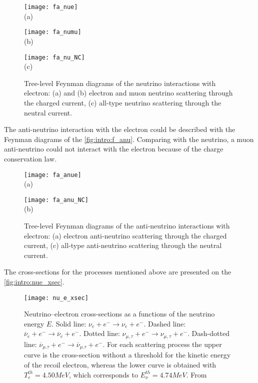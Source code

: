 \documentclass[../main.tex]{subfiles}
\begin{document}
\begin{figure}[!ht]
\centering
  \begin{minipage}[t]{0.29\linewidth}
    \centering
    \texttt{[image: fa\_nue]} \\ (a)
  \end{minipage}
  \begin{minipage}[t]{0.29\linewidth}
    \centering
    \texttt{[image: fa\_numu]} \\ (b)
  \end{minipage}
  \begin{minipage}[t]{0.29\linewidth}
    \centering
    \texttt{[image: fa\_nu\_NC]} \\ (c)
  \end{minipage}
  \caption{Tree-level Feynman diagrams of the neutrino interactions with electron: (a) and (b) electron and muon neutrino scattering through the charged current, (c) all-type neutrino scattering through the neutral current.}
  \label{fig:intro:f_nu}
\end{figure}

The anti-neutrino interaction with the electron could be described with the Feynman diagrams of the \autoref{fig:intro:f_anu}. Comparing with the neutrino, a muon anti-neutrino could not interact with the electron because of the charge conservation law.

\begin{figure}[!ht]
\centering
  \begin{minipage}[t]{0.29\linewidth}
    \centering
    \texttt{[image: fa\_anue]} \\ (a)
  \end{minipage}
  \begin{minipage}[t]{0.29\linewidth}
    \centering
    \texttt{[image: fa\_anu\_NC]} \\ (b)
    \end{minipage}
  \caption{Tree-level Feynman diagrams of the anti-neutrino interactions with electron: (a) electron anti-neutrino scattering through the charged current, (c) all-type anti-neutrino scattering through the neutral current.}
  \label{fig:intro:f_anu}
\end{figure}

The cross-sections for the processes mentioned above are presented on the \autoref{fig:intro:nue_xsec}.

\begin{figure}[!ht]
  \centering
  \texttt{[image: nu\_e\_xsec]}
  \caption{Neutrino–electron cross-sections as a functions of the neutrino energy $E$. Solid line: $\nu_e+e^-\to\nu_e+e^-$. Dashed line: $\overline{\nu}_e+e^-\to\overline{\nu}_e+e^-$. Dotted line: $\nu_{\mu, \tau}+e^-\to\nu_{\mu, \tau}+e^-$. Dash-dotted line: $\overline{\nu}_{\mu. \tau}+e^-\to\overline{\nu}_{\mu. \tau}+e^-$. For each scattering process the upper curve is the cross-section without a threshold for the kinetic energy of the recoil electron, whereas the lower curve is obtained with $T_e^{th}=4.50 MeV$, which corresponds to $E_\nu^{th} = 4.74 MeV$. From~\cite{auerbach2001measurement}}
  \label{fig:intro:nue_xsec}
\end{figure}
\end{document}
